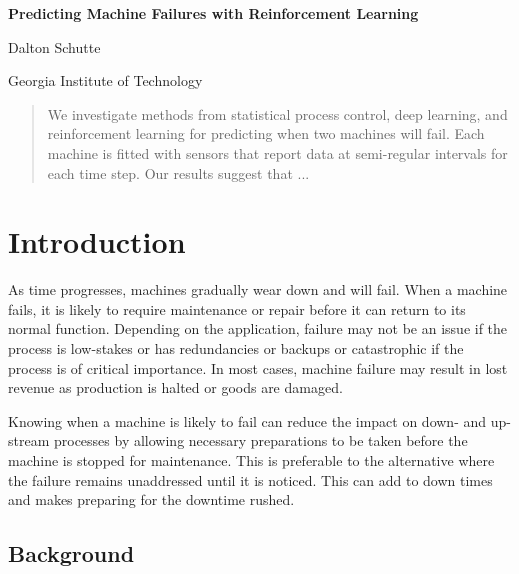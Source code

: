 \documentclass[12pt]{article}
\begin{document}
\baselineskip 12pt

\begin{center}
\textbf{\Large Predicting Machine Failures with Reinforcement Learning}

\vspace{1.5cc}
{ \sc Dalton Schutte}\\

\vspace{0.3 cm}

{\small Georgia Institute of Technology}
\end{center}
\vspace{1.5cc}



\begin{abstract}
  \noindent We investigate methods from statistical process control, deep learning, and reinforcement learning
  for predicting when two machines will fail. Each machine is fitted with sensors that report data at semi-regular
  intervals for each time step. Our results suggest that ...

\end{abstract}



\section{Introduction} \label{form}

As time progresses, machines gradually wear down and will fail. When a machine fails,
it is likely to require maintenance or repair before it can return to its normal function.
Depending on the application, failure may not be an issue if the process is low-stakes or
has redundancies or backups or catastrophic if the process is of critical importance. In
most cases, machine failure may result in lost revenue as production is halted or goods
are damaged.

Knowing when a machine is likely to fail can reduce the impact on down- and up-stream
processes by allowing necessary preparations to be taken before the machine is stopped
for maintenance. This is preferable to the alternative where the failure remains unaddressed
until it is noticed. This can add to down times and makes preparing for the downtime 
rushed.

\subsection{Background} \label{back}
\end{document}
